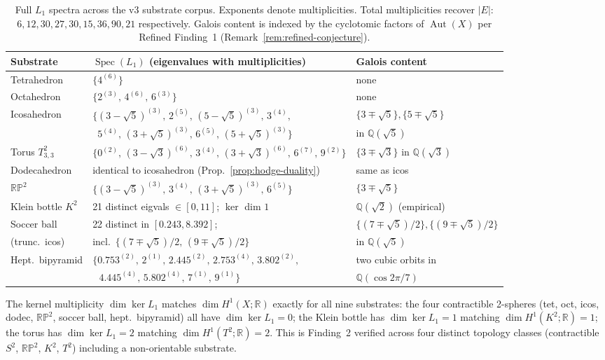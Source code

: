 \documentclass[12pt,a4paper]{article}
\theoremstyle{definition}
\theoremstyle{remark}
\newcommand{\bR}{\mathbb{R}}
\newcommand{\bQ}{\mathbb{Q}}                %
\DeclareMathOperator{\Aut}{Aut}
\DeclareMathOperator{\Spec}{Spec}
\begin{document}
\begin{table}[H]
\centering\small
\begin{tabular}{lll}
\toprule
Substrate & $\Spec(L_1)$ (eigenvalues with multiplicities) & Galois content \\
\midrule
Tetrahedron   & $\{4^{(6)}\}$ & none \\
Octahedron    & $\{2^{(3)},\, 4^{(6)},\, 6^{(3)}\}$ & none \\
Icosahedron   & $\{(3{-}\sqrt 5)^{(3)},\, 2^{(5)},\, (5{-}\sqrt 5)^{(3)},\, 3^{(4)},\,$ & $\{3 \mp \sqrt 5\}, \{5 \mp \sqrt 5\}$ \\
              & $\phantom{\{} 5^{(4)},\, (3{+}\sqrt 5)^{(3)},\, 6^{(5)},\, (5{+}\sqrt 5)^{(3)}\}$ & in $\bQ(\sqrt 5)$ \\
Torus $T^2_{3,3}$ & $\{0^{(2)},\, (3{-}\sqrt 3)^{(6)},\, 3^{(4)},\, (3{+}\sqrt 3)^{(6)},\, 6^{(7)},\, 9^{(2)}\}$ & $\{3 \mp \sqrt 3\}$ in $\bQ(\sqrt 3)$ \\
Dodecahedron  & identical to icosahedron (Prop.~\ref{prop:hodge-duality}) & same as icos \\
$\mathbb{RP}^2$ & $\{(3{-}\sqrt 5)^{(3)},\, 3^{(4)},\, (3{+}\sqrt 5)^{(3)},\, 6^{(5)}\}$ & $\{3 \mp \sqrt 5\}$ \\
Klein bottle $K^2$ & 21 distinct eigvals $\in [0, 11]$; $\ker$ dim $1$ & $\bQ(\sqrt 2)$ (empirical) \\
Soccer ball & 22 distinct in $[0.243, 8.392]$; & $\{(7\mp\sqrt 5)/2\}, \{(9\mp\sqrt 5)/2\}$ \\
  (trunc.\ icos) & incl.\ $\{(7\mp\sqrt 5)/2,\, (9\mp\sqrt 5)/2\}$ & in $\bQ(\sqrt 5)$ \\
Hept.\ bipyramid & $\{0.753^{(2)},\, 2^{(1)},\, 2.445^{(2)},\, 2.753^{(4)},\, 3.802^{(2)},$ & two cubic orbits in \\
  & $\phantom{\{}\, 4.445^{(4)},\, 5.802^{(4)},\, 7^{(1)},\, 9^{(1)}\}$ &  $\bQ(\cos 2\pi/7)$ \\
\bottomrule
\end{tabular}
\caption{Full $L_1$ spectra across the v3 substrate corpus. Exponents
denote multiplicities. Total multiplicities recover $|E|$: $6, 12, 30,
27, 30, 15, 36, 90, 21$ respectively. Galois content is indexed by the
cyclotomic factors of $\Aut(X)$ per Refined Finding~1
(Remark~\ref{rem:refined-conjecture}).}\label{tab:cs-spectrum-summary}
\end{table}

The kernel multiplicity $\dim \ker L_1$ matches $\dim H^1(X; \bR)$
exactly for all nine substrates: the four contractible 2-spheres
(tet, oct, icos, dodec, $\mathbb{RP}^2$, soccer ball, hept.\ bipyramid)
all have $\dim \ker L_1 = 0$; the Klein bottle has $\dim \ker L_1 = 1$
matching $\dim H^1(K^2; \bR) = 1$; the torus has $\dim \ker L_1 = 2$
matching $\dim H^1(T^2; \bR) = 2$. This is Finding~2 verified across
four distinct topology classes (contractible $S^2$, $\mathbb{RP}^2$,
$K^2$, $T^2$) including a non-orientable substrate.
\end{document}
